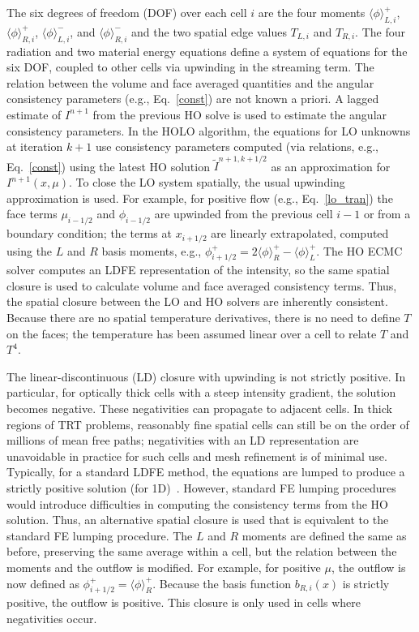 \documentclass[12pt]{article}
\newcommand{\mom}[1]{\langle #1 \rangle}
\begin{document}
\begin{center}
The six degrees of freedom (DOF) over each cell $i$ are the four moments $\mom{\phi}_{L,i}^+$,
$\mom{\phi}_{R,i}^+$, $\mom{\phi}_{L,i}^-$, and $\mom{\phi}_{R,i}^-$ and the two
spatial edge values $T_{L,i}$ and $T_{R,i}$. The four radiation and two material
energy equations define a system of equations for the six DOF, coupled to other cells
via upwinding in the streaming term.
The relation between the volume and face averaged quantities and the angular consistency parameters (e.g., Eq.~\eqref{const}) are not known a priori. 
A lagged estimate of $I^{n+1}$ from the previous HO solve is
used to estimate the angular consistency parameters. In the HOLO algorithm, the equations for LO unknowns at iteration $k+1$ use consistency parameters
computed (via relations, e.g., Eq.~\eqref{const}) using the latest HO solution $\tilde{I}^{n+1,k+1/2}$
as an approximation for $I^{n+1}(x,\mu)$. To close the LO system spatially, the usual upwinding
approximation is used.  For example, for positive flow (e.g., Eq.~\eqref{lo_tran}) the face terms $\mu_{i-1/2}$ and $\phi_{i-1/2}$
are upwinded from the previous cell $i-1$ or from a boundary condition; the terms
at $x_{i+1/2}$ are linearly extrapolated, computed using the $L$ and $R$ basis
moments, e.g., $\phi^+_{i+1/2} = 2\mom{\phi}_R^+ - \mom{\phi}_L^+$. 
The HO ECMC solver computes an LDFE representation of the intensity, so the same
spatial closure is used to calculate volume and face averaged consistency terms.  Thus, the spatial closure between the LO and HO solvers are inherently
consistent.  Because there are no
spatial temperature derivatives, there is no need to define $T$ on the faces; the temperature has been assumed linear over a cell to
relate $T$ and $T^4$.

The linear-discontinuous (LD) closure with upwinding is not strictly positive.  In particular, for
optically thick cells with a steep intensity gradient, the solution becomes negative.
These negativities can propagate to adjacent cells. In thick regions of
TRT problems, reasonably fine spatial cells can still be on the order of millions of mean
free paths; negativities with an LD representation are unavoidable in practice for
such cells and mesh refinement is of minimal use.  Typically, for a standard LDFE method,
the equations are lumped to produce a strictly positive solution (for 1D)~\cite{morel_newton}. However, standard FE lumping
procedures would introduce difficulties in computing the consistency terms from the
HO solution.  Thus, an alternative spatial closure is used that is equivalent to the
standard FE lumping procedure.  The $L$ and $R$ moments are defined the same as before,
preserving the same average within a cell, but the relation between the moments and
the outflow is modified.   For example, for positive $\mu$,
the outflow is now defined as $\phi^+_{i+1/2} = \mom{\phi}_R^+.$  Because the basis function $b_{R,i}(x)$ is strictly
positive, the outflow is positive.  This closure is only used
in cells where negativities occur.


\end{center}
\end{document}

